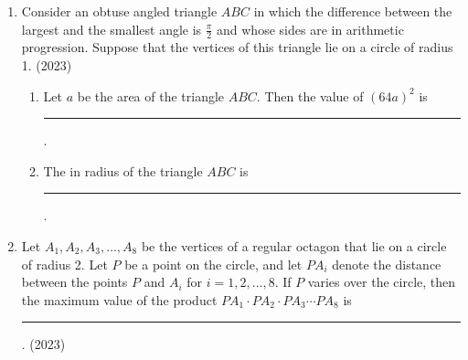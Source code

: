 \begin{enumerate}[label=\thesubsection.\arabic*,ref=\thesubsection.\theenumi]
\item Consider an obtuse angled triangle $ABC$ in which the difference between the largest and the smallest angle is $\frac{\pi}{2}$ and whose sides are in arithmetic progression. Suppose that the vertices of this triangle lie on a circle of radius 1.
\hfill (2023)
\begin{enumerate}
\item Let $a$ be the area of the triangle $ABC$. Then the value of $(64a)^2$ is
\rule{1cm}{0.1pt}.
\item The in radius of the triangle $ABC$ is
\rule{1cm}{0.1pt}.
\end{enumerate}
%
\item Let $A_1, A_2, A_3, \dots, A_8$ be the vertices of a regular octagon that lie on a circle of radius 2. Let $P$ be a point on the circle, and let $PA_i$ denote the distance between the points $P$ and $A_i$ for $i = 1,2, \dots, 8$. If $P$ varies over the circle, then the maximum value of the product $PA_1 \cdot PA_2 \cdot PA_3 \cdots PA_8$ is
\rule{1cm}{0.1pt}.
\hfill (2023)



\end{enumerate}

